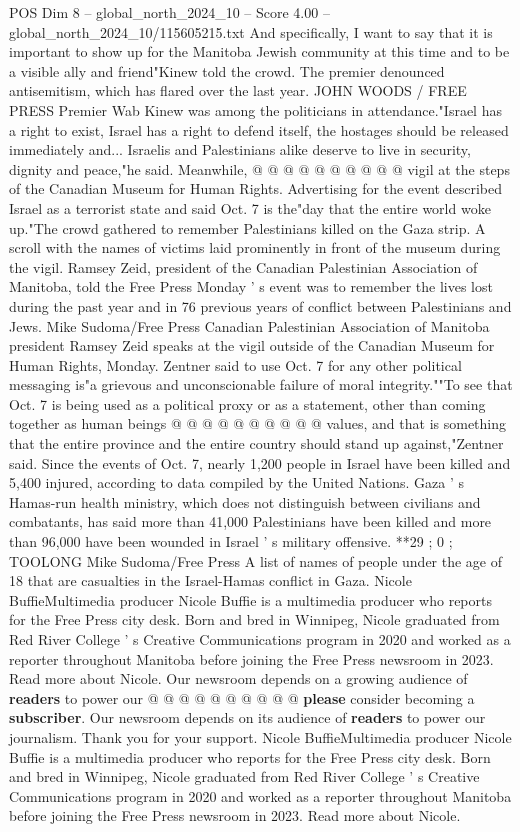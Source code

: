 \begin{textsample}{POS Dim 8 – global\_north\_2024\_10 – Score 4.00 – global\_north\_2024\_10/115605215.txt}
And specifically, I want to say that it is important to show up for the Manitoba Jewish community at this time and to be a visible ally and friend"Kinew told the crowd.
The premier denounced antisemitism, which has flared over the last year.
JOHN WOODS / FREE PRESS Premier Wab Kinew was among the politicians in attendance."Israel has a right to exist, Israel has a right to defend itself, the hostages should be released immediately and...
Israelis and Palestinians alike deserve to live in security, dignity and peace,"he said.
Meanwhile, @ @ @ @ @ @ @ @ @ @ vigil at the steps of the Canadian Museum for Human Rights.
Advertising for the event described Israel as a terrorist state and said Oct. 7 is the"day that the entire world woke up."The crowd gathered to remember Palestinians killed on the Gaza strip.
A scroll with the names of victims laid prominently in front of the museum during the vigil.
Ramsey Zeid, president of the Canadian Palestinian Association of Manitoba, told the Free Press Monday ' s event was to remember the lives lost during the past year and in 76 previous years of conflict between Palestinians and Jews.
Mike Sudoma/Free Press Canadian Palestinian Association of Manitoba president Ramsey Zeid speaks at the vigil outside of the Canadian Museum for Human Rights, Monday.
Zentner said to use Oct. 7 for any other political messaging is"a grievous and unconscionable failure of moral integrity.""To see that Oct. 7 is being used as a political proxy or as a statement, other than coming together as human beings @ @ @ @ @ @ @ @ @ @ values, and that is something that the entire province and the entire country should stand up against,"Zentner said.
Since the events of Oct. 7, nearly 1,200 people in Israel have been killed and 5,400 injured, according to data compiled by the United Nations.
Gaza ' s Hamas-run health ministry, which does not distinguish between civilians and combatants, has said more than 41,000 Palestinians have been killed and more than 96,000 have been wounded in Israel ' s military offensive. **29 ; 0 ; TOOLONG Mike Sudoma/Free Press A list of names of people under the age of 18 that are casualties in the Israel-Hamas conflict in Gaza.
Nicole BuffieMultimedia producer Nicole Buffie is a multimedia producer who reports for the Free Press city desk.
Born and bred in Winnipeg, Nicole graduated from Red River College ' s Creative Communications program in 2020 and worked as a reporter throughout Manitoba before joining the Free Press newsroom in 2023.
Read more about Nicole.
Our newsroom depends on a growing audience of \textbf{readers} to power our @ @ @ @ @ @ @ @ @ @ \textbf{please} consider becoming a \textbf{subscriber}.
Our newsroom depends on its audience of \textbf{readers} to power our journalism.
Thank you for your support.
Nicole BuffieMultimedia producer Nicole Buffie is a multimedia producer who reports for the Free Press city desk.
Born and bred in Winnipeg, Nicole graduated from Red River College ' s Creative Communications program in 2020 and worked as a reporter throughout Manitoba before joining the Free Press newsroom in 2023.
Read more about Nicole.

\end{textsample}
